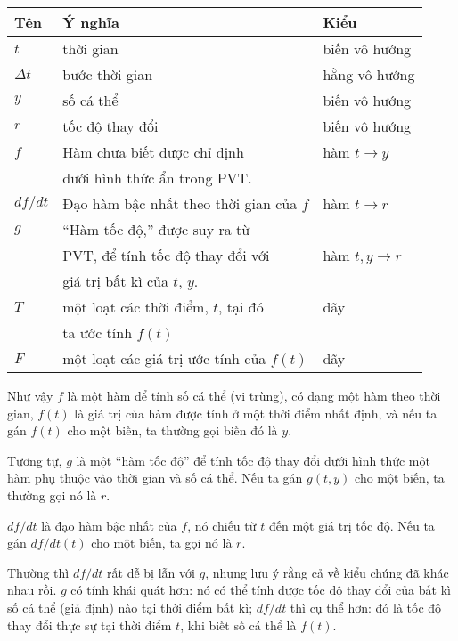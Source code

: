 \documentclass[12pt]{book}
\begin{document}
\begin{tabular}{|l|l|l|}
\hline
Tên     &  Ý nghĩa             &  Kiểu  \\
\hline \hline
$t$     &  thời gian                 & biến vô hướng \\\hline
$\Delta t$  &  bước thời gian         & hằng vô hướng \\\hline

$y$     &  số cá thể           & biến vô hướng \\\hline
$r$     &  tốc độ thay đổi       & biến vô hướng \\\hline

$f$     &  Hàm chưa biết được chỉ định    &  hàm $t \to y$  \\
        &  dưới hình thức ẩn trong PVT.             &    \\\hline

$df/dt$  &  Đạo hàm bậc nhất theo thời gian của $f$  &  hàm $t \to r$  \\ \hline

$g$     &  ``Hàm tốc độ,'' được suy ra từ     &  \\
        &  PVT, để tính tốc độ thay đổi với     &  hàm $t, y \to r$  \\
        &  giá trị bất kì của $t$, $y$.           &   \\\hline

$T$     & một loạt các thời điểm, $t$, tại đó   & dãy \\
              & ta ước tính $f(t)$    &           \\\hline
$F$     & một loạt các giá trị ước tính của $f(t)$  & dãy \\
\hline
\end{tabular}

Như vậy $f$ là một hàm để tính số cá thể (vi trùng), có dạng một hàm
theo thời gian, $f(t)$ là giá trị của hàm được tính ở một thời điểm nhất định,
và nếu ta gán $f(t)$ cho một biến, ta thường gọi biến đó là $y$.

Tương tự, $g$ là một ``hàm tốc độ'' để tính tốc độ thay đổi dưới
hình thức một hàm phụ thuộc vào thời gian và số cá thể. Nếu ta gán
$g(t,y)$ cho một biến, ta thường gọi nó là $r$.

$df/dt$ là đạo hàm bậc nhất của $f$, nó chiếu từ $t$ đến một giá trị
tốc độ.  Nếu ta gán $df/dt(t)$ cho một biến, ta gọi nó là $r$.

Thường thì $df/dt$ rất dễ bị lẫn với $g$, nhưng lưu ý rằng cả về kiểu
chúng đã khác nhau rồi.  $g$ có tính khái quát hơn: nó có thể tính
được tốc độ thay đổi của bất kì số cá thể (giả định) nào tại thời điểm
bất kì; $df/dt$ thì cụ thể hơn: đó là tốc độ thay đổi thực sự tại thời
điểm $t$, khi biết số cá thể là $f(t)$.
\end{document}
